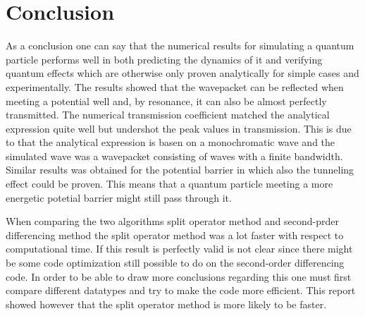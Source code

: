 \section{Conclusion}

As a conclusion one can say that the numerical results for simulating a quantum particle performs well in both predicting the dynamics of it and verifying quantum effects which are otherwise only proven analytically for simple cases and experimentally. The results showed that the wavepacket can be reflected when meeting a potential well and, by resonance, it can also be almost perfectly transmitted. The numerical transmission coefficient matched the analytical expression quite well  but undershot the peak values in transmission. This is due to that the analytical expression is basen on a monochromatic wave and the simulated wave was a wavepacket consisting of waves with a finite bandwidth. Similar results was obtained for the potential barrier in which also the tunneling effect could be proven. This means that a quantum particle meeting a more energetic potetial barrier might still pass through it.

When comparing the two algorithms split operator method and second-prder differencing method the split operator method was a lot faster with respect to computational time. If this result is perfectly valid is not clear since there might be some code optimization still possible to do on the second-order differencing code. In order to be able to draw more conclusions regarding this one must first compare different datatypes and try to make the code more efficient. This report showed however that the split operator method is more likely to be faster.
